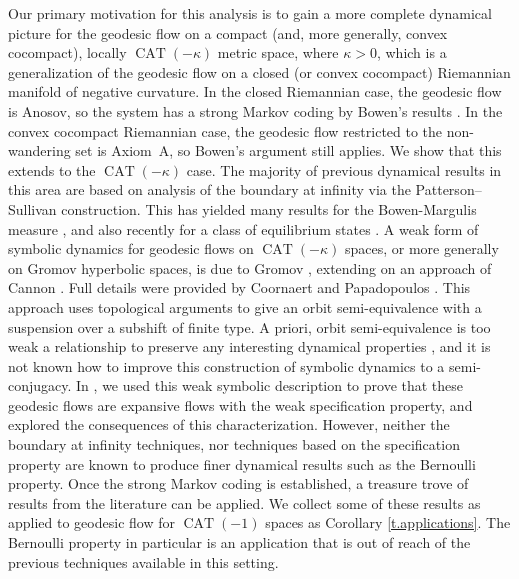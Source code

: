 \documentclass[10pt]{amsart}
\theoremstyle{definition}
\numberwithin{equation}{section}
\DeclareMathOperator{\CAT}{CAT}
\begin{document}
Our primary motivation for this analysis is to gain a more complete dynamical picture for the geodesic flow on a compact (and, more generally, convex cocompact), locally $\CAT(-\kappa)$ metric space, where $\kappa>0$, which is a generalization of the geodesic flow on a closed (or convex cocompact) Riemannian manifold of negative curvature. In the closed Riemannian case, the geodesic flow is Anosov, so the system has a strong Markov coding by Bowen's results \cite{bowen-symbolic}. In the convex cocompact Riemannian case, the geodesic flow restricted to the non-wandering set is Axiom~A, so Bowen's argument still applies. We show that this extends to the $\CAT(-\kappa)$ case. The majority of previous dynamical results in this area are based on analysis of the boundary at infinity via the Patterson--Sullivan construction. This has yielded many results for the Bowen-Margulis measure \cite{Roblin}, and also recently for a class of equilibrium states \cite{BPP16}. A weak form of symbolic dynamics for geodesic flows on $\CAT(-\kappa)$ spaces, or more generally on Gromov hyperbolic spaces, is due to Gromov \cite{gromov}, extending on an approach of Cannon \cite{Cannon}. Full details were provided by Coornaert and Papadopoulos \cite{cp}. This approach uses topological arguments to give an orbit semi-equivalence with a suspension over a subshift of finite type. A priori, orbit semi-equivalence is too weak a relationship to preserve any interesting dynamical properties \cite{GM, KT17}, and it is not known how to improve this construction of symbolic dynamics to a semi-conjugacy. In \cite{CLT}, we used this weak symbolic description to prove that these geodesic flows are expansive flows with the weak specification property, and explored the consequences of this characterization. However, neither the boundary at infinity techniques, nor techniques based on the specification property are known to produce finer dynamical results such as the Bernoulli property. Once the strong Markov coding is established, a treasure trove of results from the literature can be applied. We collect some of these results as applied to geodesic flow for $\CAT(-1)$ spaces as Corollary \ref{t.applications}. The Bernoulli property in particular is an application that is out of reach of the previous techniques available in this setting.
\end{document}
